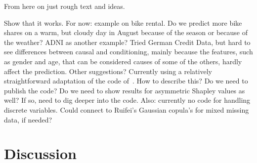 \documentclass{article}
\newcommand{\comment}[1]{{\color{red} #1}}
\begin{document}
\comment{From here on just rough text and ideas.}

Show that it works. For now: example on bike rental. Do we predict more bike shares on a warm, but cloudy day in August because of the season or because of the weather? \comment{ADNI as another example? Tried German Credit Data, but hard to see differences between causal and conditioning, mainly because the features, such as gender and age, that can be considered causes of some of the others, hardly affect the prediction. Other suggestions?} \comment{Currently using a relatively straightforward adaptation of the code of~\cite{aas2019explaining}. How to describe this? Do we need to publish the code? Do we need to show results for asymmetric Shapley values as well? If so, need to dig deeper into the code. Also: currently no code for handling discrete variables. Could connect to Ruifei's Gaussian copula's for mixed missing data, if needed?}

\section{Discussion}
\end{document}
